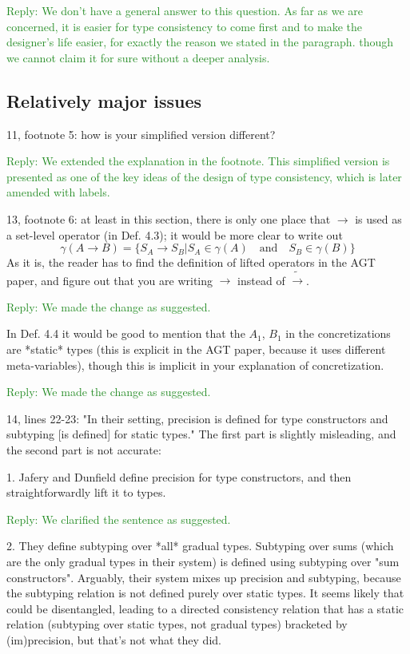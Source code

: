 \documentclass[dvipsnames]{article}
\newcommand\reply[1]{\textcolor{ForestGreen}{Reply: #1}}
\begin{document}
\reply{We don't have a general answer to this question. As far as we are
  concerned, it is easier for type consistency to come first and to make the
  designer's life easier, for exactly the reason we stated in the paragraph.
  though we cannot claim it for sure without a deeper analysis.}


\subsection{Relatively major issues}

11, footnote 5: how is your simplified version different?

\reply{We extended the explanation in the footnote. This simplified version
  is presented as one of the key ideas of the design of type consistency, which
  is later amended with labels.}

13, footnote 6: at least in this section, there is only one place that $\rightarrow$ is used
as a set-level operator (in Def. 4.3); it would be more clear to write out
\[
  \gamma(A \rightarrow B) = \{  S_A \rightarrow S_B | S_A \in \gamma(A) \quad \text{and} \quad S_B \in \gamma(B)    \}
\]
As it is, the reader has to find the definition of lifted operators in the AGT
paper, and figure out that you are writing $\rightarrow$ instead of $\tilde{\rightarrow}$.

\reply{We made the change as suggested.}

In Def. 4.4 it would be good to mention that the $A_1$, $B_1$ in the
concretizations are *static* types (this is explicit in the AGT paper, because
it uses different meta-variables), though this is implicit in your explanation
of concretization.

\reply{We made the change as suggested.}

14, lines 22-23: "In their setting, precision is defined for type constructors
and subtyping [is defined] for static types." The first part is slightly
misleading, and the second part is not accurate:

1. Jafery and Dunfield define precision for type constructors, and then
straightforwardly lift it to types.

\reply{We clarified the sentence as suggested.}

2. They define subtyping over *all* gradual types. Subtyping over sums (which
are the only gradual types in their system) is defined using subtyping over "sum
constructors". Arguably, their system mixes up precision and subtyping, because
the subtyping relation is not defined purely over static types. It seems likely
that could be disentangled, leading to a directed consistency relation that has
a static relation (subtyping over static types, not gradual types) bracketed by
(im)precision, but that's not what they did.
\end{document}
